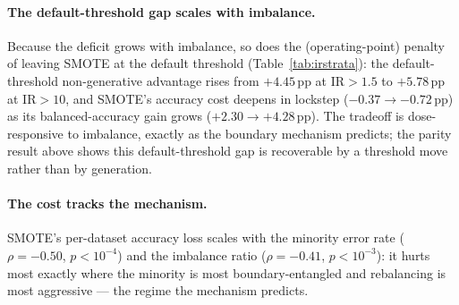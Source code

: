 \begin{table}[t]
\centering
\caption{Threshold parity: best non-generative $-$ best generative balanced
accuracy when \emph{every} strategy is given the same out-of-fold threshold tuning,
per base learner (27 KEEL binary datasets; 26 for RF, whose isolet cell is
computationally infeasible). On XGBoost, RF, logistic regression, and SVM the
difference is within $\pm1$\,pp (versus a $+5.76$\,pp non-generative advantage at
the default threshold): the default-threshold ``dominance'' is an operating-point
effect. The MLP row is the diagnostic exception, analysed in the text: imbalance
degrades a single MLP's \emph{ranking} (AUC $0.769$, restored to $0.892$ by
resampling), so its deficit is not threshold-recoverable; MLPs also support no
class weighting, leaving threshold-moving as the sole non-generative entry.}
\label{tab:parity}

\end{table}

\paragraph{The default-threshold gap scales with imbalance.} Because the deficit
grows with imbalance, so does the (operating-point) penalty of leaving SMOTE at the
default threshold (Table~\ref{tab:irstrata}): the default-threshold non-generative
advantage rises from $+4.45$\,pp at $\mathrm{IR}>1.5$ to $+5.78$\,pp at
$\mathrm{IR}>10$, and SMOTE's accuracy cost deepens in lockstep ($-0.37 \to
-0.72$\,pp) as its balanced-accuracy gain grows ($+2.30 \to +4.28$\,pp). The
tradeoff is dose-responsive to imbalance, exactly as the boundary mechanism
predicts; the parity result above shows this default-threshold gap is recoverable
by a threshold move rather than by generation.

\paragraph{The cost tracks the mechanism.} SMOTE's per-dataset accuracy loss scales
with the minority error rate ($\rho=-0.50$, $p<10^{-4}$) and the imbalance ratio
($\rho=-0.41$, $p<10^{-3}$): it hurts most exactly where the minority is most
boundary-entangled and rebalancing is most aggressive --- the regime the mechanism
predicts.

